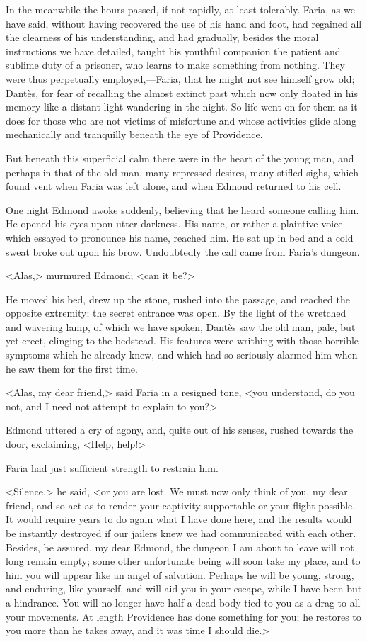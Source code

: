  In the meanwhile the hours passed, if not rapidly, at least tolerably. Faria, as we have said, without having recovered the use of his hand and foot, had regained all the clearness of his understanding, and had gradually, besides the moral instructions we have detailed, taught his youthful companion the patient and sublime duty of a prisoner, who learns to make something from nothing. They were thus perpetually employed,—Faria, that he might not see himself grow old; Dantès, for fear of recalling the almost extinct past which now only floated in his memory like a distant light wandering in the night. So life went on for them as it does for those who are not victims of misfortune and whose activities glide along mechanically and tranquilly beneath the eye of Providence. 

 But beneath this superficial calm there were in the heart of the young man, and perhaps in that of the old man, many repressed desires, many stifled sighs, which found vent when Faria was left alone, and when Edmond returned to his cell. 

 One night Edmond awoke suddenly, believing that he heard someone calling him. He opened his eyes upon utter darkness. His name, or rather a plaintive voice which essayed to pronounce his name, reached him. He sat up in bed and a cold sweat broke out upon his brow. Undoubtedly the call came from Faria's dungeon. 

 <Alas,> murmured Edmond; <can it be?> 

 He moved his bed, drew up the stone, rushed into the passage, and reached the opposite extremity; the secret entrance was open. By the light of the wretched and wavering lamp, of which we have spoken, Dantès saw the old man, pale, but yet erect, clinging to the bedstead. His features were writhing with those horrible symptoms which he already knew, and which had so seriously alarmed him when he saw them for the first time. 

 <Alas, my dear friend,> said Faria in a resigned tone, <you understand, do you not, and I need not attempt to explain to you?> 

 Edmond uttered a cry of agony, and, quite out of his senses, rushed towards the door, exclaiming, <Help, help!> 

 Faria had just sufficient strength to restrain him. 

 <Silence,> he said, <or you are lost. We must now only think of you, my dear friend, and so act as to render your captivity supportable or your flight possible. It would require years to do again what I have done here, and the results would be instantly destroyed if our jailers knew we had communicated with each other. Besides, be assured, my dear Edmond, the dungeon I am about to leave will not long remain empty; some other unfortunate being will soon take my place, and to him you will appear like an angel of salvation. Perhaps he will be young, strong, and enduring, like yourself, and will aid you in your escape, while I have been but a hindrance. You will no longer have half a dead body tied to you as a drag to all your movements. At length Providence has done something for you; he restores to you more than he takes away, and it was time I should die.> 

